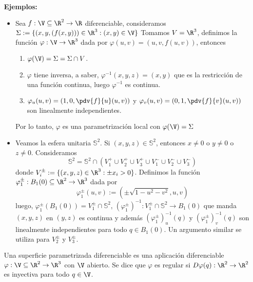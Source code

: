 \documentclass{article}
\begin{document}
\noindent\textbf{Ejemplos: }
\begin{itemize}
    \item Sea $f:\V\subseteq\R^{2}\to\R$ diferenciable, consideramos $\Sigma:=
    \{(x,y,(f(x,y)))\in\R^{3}:(x,y)\in\V\}$ Tomamos $V=\R^{3}$, definimos la función $\varphi:
    \V\to\R^{3}$ dada por $\varphi(u,v)=(u,v,f(u,v))$, entonces
    \begin{enumerate}
        \item $\varphi(\V)=\Sigma=\Sigma\cap V$.
        \item $\varphi$ tiene inversa, a saber, $\varphi^{-1}(x,y,z)=(x,y)$ que es la restricción
        de una función continua, luego $\varphi^{-1}$ es continua.
        \item $\varphi_{u}(u,v)=\left(1,0,\pdv{f}{u}(u,v)\right)$ y $\varphi_{v}(u,v)=
        \left(0,1,\pdv{f}{v}(u,v)\right)$ son linealmente independientes.
    \end{enumerate}
    Por lo tanto, $\varphi$ es una parametrización local con $\varphi(\V)=\Sigma$

    \item Veamos la esfera unitaria $\mathbb{S}^{2}$. Si $(x,y,z)\in\mathbb{S}^{2}$, entonces 
    $x\neq0$ o $y\neq0$ o $z\neq0$. Consideramos
    \begin{equation*}
        \mathbb{S}^{2}=\mathbb{S}^{2}\cap\left(V_{1}^{+}\cup V_{2}^{+}\cup V_{3}^{+}
        \cup V_{1}^{-}\cup V_{2}^{-}\cup V_{3}^{-}\right)
    \end{equation*}
    donde $V_{i}^{\pm}:=\{(x,y,z)\in\R^{3}:\pm x_{i}>0\}$. Definimos la función 
    $\varphi_{1}^{\pm}:B_{1}(0)\subseteq\R^{2}\to\R^{3}$ dada por
    \begin{equation*}
        \varphi_{1}^{\pm}(u,v):=(\pm\sqrt{1-u^{2}-v^{2}},u,v)
    \end{equation*}
    luego, $\varphi_{1}^{\pm}(B_{1}(0))=V_{1}^{\pm}\cap\mathbb{S}^{2}$, 
    $(\varphi_{1}^{\pm})^{-1}:V_{1}^{\pm}\cap\mathbb{S}^{2}\to B_{1}(0)$ que manda $(x,y,z)$ en 
    $(y,z)$ es continua y además $(\varphi_{1}^{\pm})^{-1}_{u}(q)$ y 
    $(\varphi_{1}^{\pm})^{-1}_{v}(q)$ son linealmente independientes para todo $q\in B_{1}(0)$. Un
    argumento similar se utiliza para $V_{2}^{\pm}$ y $V_{3}^{\pm}$.
\end{itemize}

\begin{dfn}
    Una superficie parametrizada diferenciable es una aplicación  diferenciable $\varphi:\V
    \subseteq\R^{2}\to\R^{3}$ con $\V$ abierto. Se dice que $\varphi$ es regular si 
    $D\varphi(q):\R^{2}\to\R^{2}$ es inyectiva para todo $q\in\V$.
\end{dfn}
\end{document}
